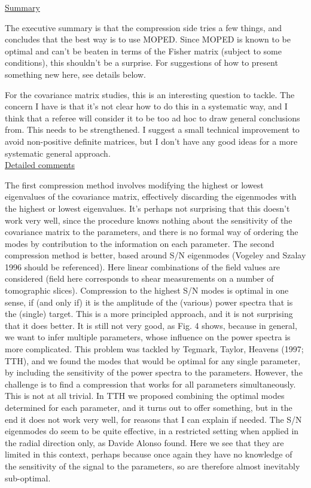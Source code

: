 \documentclass{article}
\begin{document}
	\underline{Summary}
	
	The executive summary is that the compression side tries a few things, and concludes that the best way is to use MOPED.  Since MOPED is known to be optimal and can’t be beaten in terms of the Fisher matrix (subject to some conditions), this shouldn’t be a surprise.  For suggestions of how to present something new here, see details below.
	
	For the covariance matrix studies, this is an interesting question to tackle.  The concern I have is that it’s not clear how to do this in a systematic way, and I think that a referee will consider it to be too ad hoc to draw general conclusions from.  This needs to be strengthened.  I suggest a small technical improvement to avoid non-positive definite matrices, but I don’t have any good ideas for a more systematic general approach. \\
	
	\underline{Detailed comments}
	
	The first compression method involves modifying the highest or lowest eigenvalues of the covariance matrix, effectively discarding the eigenmodes with the highest or lowest eigenvalues.  It’s perhaps not surprising that this doesn’t work very well, since the procedure knows nothing about the sensitivity of the covariance matrix to the parameters, and there is no formal way of ordering the modes by contribution to the information on each parameter. 
	The second compression method is better, based around S/N eigenmodes (Vogeley and Szalay 1996 should be referenced). Here linear combinations of the field values are considered (field here corresponds to shear measurements on a number of tomographic slices). Compression to the highest S/N modes is optimal in one sense, if (and only if) it is the amplitude of the (various) power spectra that is the (single) target.  This is a more principled approach, and it is not surprising that it does better.  It is still not very good, as Fig. 4 shows, because in general, we want to infer multiple parameters, whose influence on the power spectra is more complicated.  This problem was tackled by Tegmark, Taylor, Heavens (1997;  TTH), and we found the modes that would be optimal for any single parameter, by including the sensitivity of the power spectra to the parameters. However, the challenge is to find a compression that works for all parameters simultaneously.  This is not at all trivial. In TTH we proposed combining the optimal modes determined for each parameter, and it turns out to offer something, but in the end it does not work very well, for reasons that I can explain if needed.   The S/N eigenmodes do seem to be quite effective, in a restricted setting when applied in the radial direction only, as Davide Alonso found.  Here we see that they are limited in this context, perhaps because once again they have no knowledge of the sensitivity of the signal to the parameters, so are therefore almost inevitably sub-optimal.
	
\end{document}
